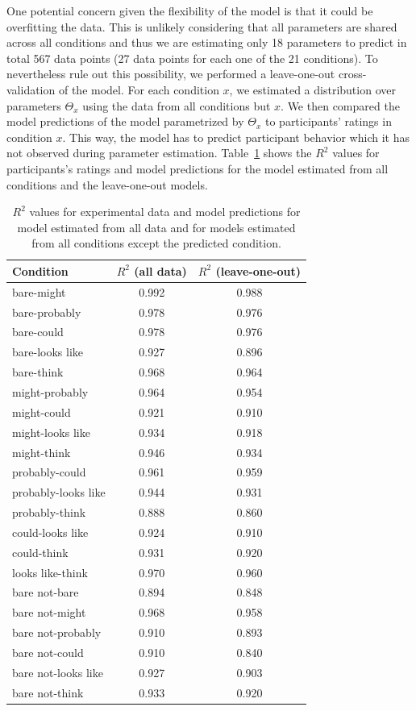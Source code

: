 \documentclass[man, floatsintext]{apa6}
\begin{document}
One potential concern given the flexibility of the model is that it could be overfitting the data. 
This is unlikely considering that all parameters are shared across all conditions and thus we are estimating only 18 parameters to predict in total 567 data points 
(27 data points for each one of the 21 conditions). To nevertheless rule out this possibility, we performed a leave-one-out cross-validation of
the model. For each condition $x$, we estimated a distribution over parameters $\Theta_x$ using the data from all conditions but $x$. We then
compared the model predictions of the model parametrized by $\Theta_x$ to participants' ratings in condition $x$. This way, the model has to predict
participant behavior which it has not observed during parameter estimation. Table~\ref{tbl:correlations} shows the $R^2$ values for participants's
ratings and model predictions for the model estimated from all conditions and the leave-one-out models.

\begin{table}[ht!]
\center
\begin{tabular}{l | c | c}
      Condition & $R^2$ (all data) & $R^2$ (leave-one-out) \\
      \midrule
          bare-might  &  0.992  & 0.988 \\
       bare-probably  &  0.978  & 0.976 \\
          bare-could  &  0.978  & 0.976 \\
     bare-looks like  &  0.927  & 0.896 \\
          bare-think  &  0.968  & 0.964 \\
      might-probably  &  0.964  & 0.954 \\
         might-could  &  0.921  & 0.910 \\
    might-looks like  &  0.934  & 0.918 \\
         might-think  &  0.946  & 0.934 \\
      probably-could  &  0.961  & 0.959 \\
 probably-looks like  &  0.944  & 0.931 \\
      probably-think  &  0.888  & 0.860 \\
    could-looks like  &  0.924  & 0.910 \\
         could-think  &  0.931  & 0.920 \\
    looks like-think  &  0.970  & 0.960 \\
       bare not-bare  &  0.894  & 0.848 \\
      bare not-might  &  0.968  & 0.958 \\
   bare not-probably  &  0.910  & 0.893 \\
      bare not-could  &  0.910  & 0.840 \\
 bare not-looks like  &  0.927  & 0.903 \\
      bare not-think  &  0.933  & 0.920 \\
\end{tabular}
\caption{$R^2$ values for experimental data and model predictions for model estimated from all data and for models estimated from all conditions except the predicted condition. \label{tbl:correlations}}
\end{table}
\end{document}
